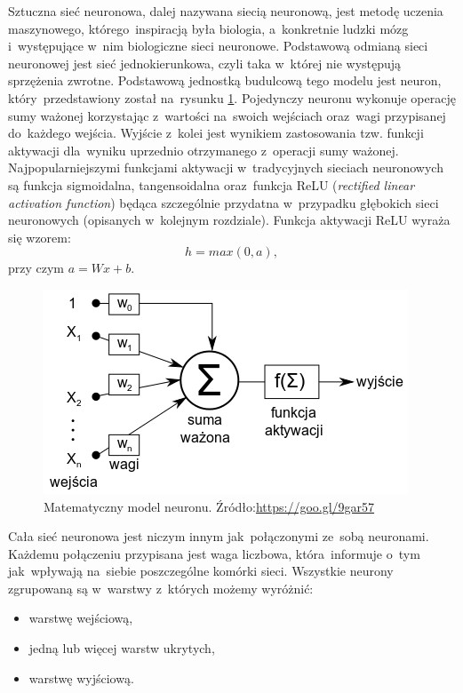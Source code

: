 Sztuczna sieć neuronowa, dalej nazywana siecią neuronową, jest metodę uczenia maszynowego, którego~inspiracją była biologia, a~konkretnie ludzki mózg i~występujące w~nim biologiczne sieci neuronowe. Podstawową odmianą sieci neuronowej jest sieć jednokierunkowa, czyli taka w~której nie występują sprzężenia zwrotne. Podstawową jednostką budulcową tego modelu jest neuron, który~przedstawiony został na~rysunku \ref{neuron}. Pojedynczy neuronu wykonuje operację sumy ważonej korzystając z~wartości na~swoich wejściach oraz~wagi przypisanej do~każdego wejścia. Wyjście z~kolei jest wynikiem zastosowania tzw. funkcji aktywacji dla~wyniku uprzednio otrzymanego z~operacji sumy ważonej. Najpopularniejszymi funkcjami aktywacji w~tradycyjnych sieciach neuronowych są funkcja sigmoidalna, tangensoidalna oraz~funkcja ReLU (\textit{rectified linear activation function}) będąca szczególnie przydatna w~przypadku głębokich sieci neuronowych (opisanych w~kolejnym rozdziale). Funkcja aktywacji ReLU wyraża się wzorem:
\begin{equation}
h=max(0,a),
\end{equation}
 przy czym $a=Wx+b$.
 
\begin{figure}[ht!]
\centering
\includegraphics{res/neuron.png}
\caption[Caption for LOF]{Matematyczny model neuronu. Źródło:\url{https://goo.gl/9gar57}\label{neuron}}
\end{figure} 

\noindent
Cała sieć neuronowa jest niczym innym jak~połączonymi ze~sobą neuronami. Każdemu połączeniu przypisana jest waga liczbowa, która~informuje o~tym jak~wpływają na~siebie poszczególne komórki sieci. Wszystkie neurony zgrupowaną są w~warstwy z~których możemy wyróżnić:
\begin{itemize}
\item warstwę wejściową,
\item jedną lub więcej warstw ukrytych,
\item warstwę wyjściową.
\end{itemize}

